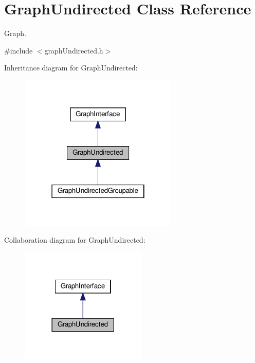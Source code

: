 \hypertarget{classGraphUndirected}{}\section{Graph\+Undirected Class Reference}
\label{classGraphUndirected}


Graph.  




{\ttfamily \#include $<$graph\+Undirected.\+h$>$}



Inheritance diagram for Graph\+Undirected\+:
\nopagebreak
\begin{figure}[H]
\begin{center}
\leavevmode
\includegraphics[width=214pt]{classGraphUndirected__inherit__graph}
\end{center}
\end{figure}


Collaboration diagram for Graph\+Undirected\+:
\nopagebreak
\begin{figure}[H]
\begin{center}
\leavevmode
\includegraphics[width=170pt]{classGraphUndirected__coll__graph}
\end{center}
\end{figure}
